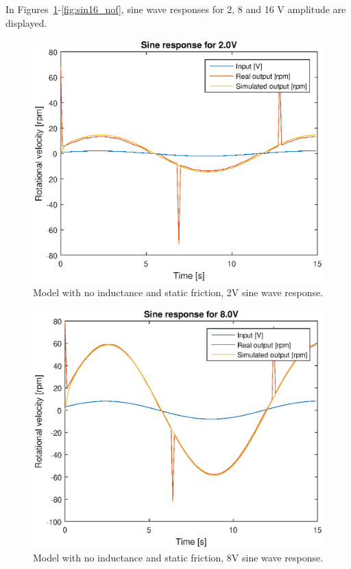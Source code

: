 In Figures~\ref{fig:sin2_nof}-\ref{fig:sin16_nof}, sine wave responses for 2,
8 and 16 V amplitude are displayed.
\begin{figure}[H]
    \centering
    \includegraphics[width=\textwidth]{./img/testrig_2Vsine_no_i_no_fric.eps}
    \caption{Model with no inductance and static friction, 2V sine wave response.}
    \label{fig:sin2_nof}
\end{figure}
\begin{figure}[H]
    \centering
    \includegraphics[width=\textwidth]{./img/testrig_8Vsine_no_i_no_fric.eps}
    \caption{Model with no inductance and static friction, 8V sine wave response.}
    \label{fig:sin8_nof}
\end{figure}
